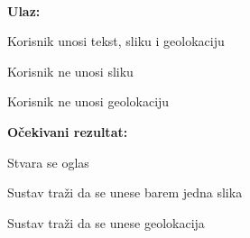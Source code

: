 			\noindent {}\\
			\textbf{Ulaz: }	
			\begin{packed_enum}
				\item Korisnik unosi tekst, sliku i geolokaciju
				\item Korisnik ne unosi sliku
				\item Korisnik ne unosi geolokaciju
				
			\end{packed_enum}
			
			\noindent \textbf{Očekivani rezultat:}
			
			\begin{packed_enum}
				\item Stvara se oglas
				\item Sustav traži da se unese barem jedna slika
				\item Sustav traži da se unese geolokacija
				
			\end{packed_enum}
			
